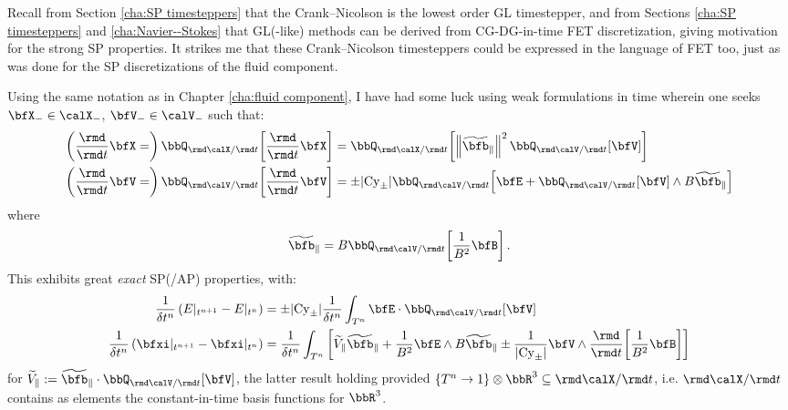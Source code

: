     \begin{remark}
        Recall from Section \ref{cha:SP timesteppers} that the Crank--Nicolson is the lowest order GL timestepper, and from Sections \ref{cha:SP timesteppers} and \ref{cha:Navier--Stokes} that GL(-like) methods can be derived from CG-DG-in-time FET discretization, giving motivation for the strong SP properties. It strikes me that these Crank--Nicolson timesteppers could be expressed in the language of FET too, just as was done for the SP discretizations of the fluid component.

        Using the same notation as in Chapter \ref{cha:fluid component}, I have had some luck using weak formulations in time wherein one seeks $\bfX_{-} \in \calX_{-}$, $\bfV_{-} \in \calV_{-}$ such that:
        \begin{align}
            \left(\frac{\rmd}{\rmd t}\bfX
                =\right)  \bbQ_{\rmd\calX/\rmd t}\!\left[\frac{\rmd}{\rmd t}\bfX\right]
                &=  \bbQ_{\rmd\calX/\rmd t}\!\left[\left\|\widetilde{\bfb}_{\parallel}\right\|^{2}\bbQ_{\rmd\calV/\rmd t}[\bfV]\right]  \\
            \left(\frac{\rmd}{\rmd t}\bfV
                =\right)  \bbQ_{\rmd\calV/\rmd t}\!\left[\frac{\rmd}{\rmd t}\bfV\right]
                &=  \pm |\rmCy_{\pm}|\bbQ_{\rmd\calV/\rmd t}\!\left[\bfE + \bbQ_{\rmd\calV/\rmd t}[\bfV]\wedge B\widetilde{\bfb}_{\parallel}\right]
        \end{align}
        where
        \begin{equation}
            \widetilde{\bfb}_{\parallel}  =  B\bbQ_{\rmd\calV/\rmd t}\!\left[\frac{1}{B^{2}}\bfB\right].
        \end{equation}
        This exhibits great \emph{exact} SP(/AP) properties, with:
        \begin{align}
            \frac{1}{\delta t^{n}}\left(E|_{t^{n + 1}} - E|_{t^{n}}\right)
                &=  \pm |\rmCy_{\pm}|\frac{1}{\delta t^{n}}\int_{T^{n}}\bfE\cdot\bbQ_{\rmd\calV/\rmd t}[\bfV]  \\
            \frac{1}{\delta t^{n}}\left(\bfxi|_{t^{n + 1}} - \bfxi|_{t^{n}}\right)
                &=  \frac{1}{\delta t^{n}}\int_{T^{n}}\left[\widetilde{V}_{\parallel}\widetilde{\bfb}_{\parallel}
                + \frac{1}{B^{2}}\bfE\wedge B\widetilde{\bfb}_{\parallel}
                \pm \frac{1}{|\rmCy_{\pm}|}\bfV\wedge\frac{\rmd}{\rmd t}\!\left[\frac{1}{B^{2}}\bfB\right]\right]
        \end{align}
        for $\widetilde{V}_{\parallel}  :=  \widetilde{\bfb}_{\parallel}\cdot\bbQ_{\rmd\calV/\rmd t}[\bfV]$, the latter result holding provided $\{{T^{n}} \rightarrow 1\}\otimes\bbR^{3} \subseteq \rmd\calX/\rmd t$, i.e. $\rmd\calX/\rmd t$ contains as elements the constant-in-time basis functions for $\bbR^{3}$.


\end{remark}
